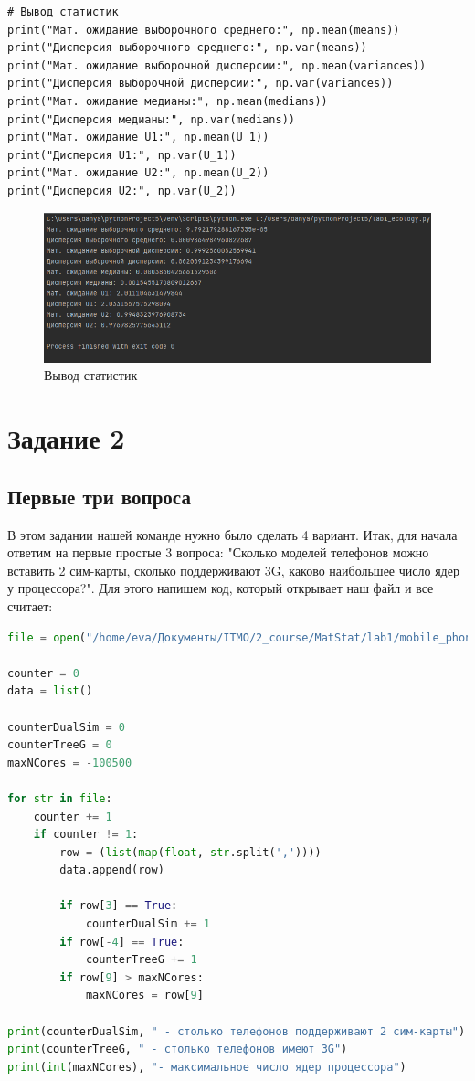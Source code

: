 \documentclass[14pt]{extreport}
\begin{document}
\begin{verbatim}
# Вывод статистик
print("Мат. ожидание выборочного среднего:", np.mean(means))
print("Дисперсия выборочного среднего:", np.var(means))
print("Мат. ожидание выборочной дисперсии:", np.mean(variances))
print("Дисперсия выборочной дисперсии:", np.var(variances))
print("Мат. ожидание медианы:", np.mean(medians))
print("Дисперсия медианы:", np.var(medians))
print("Мат. ожидание U1:", np.mean(U_1))
print("Дисперсия U1:", np.var(U_1))
print("Мат. ожидание U2:", np.mean(U_2))
print("Дисперсия U2:", np.var(U_2))
\end{verbatim}

\begin{figure}[H]
    \centering
    \includegraphics[width=0.9\linewidth]{6.png}
    \caption{Вывод статистик}
\end{figure}


\newpage
\chapter{Задание 2}
\section{Первые три вопроса}
    В этом задании нашей команде нужно было сделать 4 вариант.
Итак, для начала ответим на первые простые 3 вопроса: "Сколько моделей телефонов
можно вставить 2 сим-карты, сколько поддерживают 3G, каково наибольшее число ядер 
у процессора?". Для этого напишем код, который открывает наш файл и все считает:

\begin{lstlisting}[language=Python, caption={Код для первых трех вопросов}]
file = open("/home/eva/Документы/ITMO/2_course/MatStat/lab1/mobile_phones.csv")

counter = 0
data = list()

counterDualSim = 0
counterTreeG = 0
maxNCores = -100500

for str in file:
    counter += 1
    if counter != 1:
        row = (list(map(float, str.split(','))))
        data.append(row)

        if row[3] == True:
            counterDualSim += 1
        if row[-4] == True:
            counterTreeG += 1
        if row[9] > maxNCores:
            maxNCores = row[9]

print(counterDualSim, " - столько телефонов поддерживают 2 сим-карты")
print(counterTreeG, " - столько телефонов имеют 3G")
print(int(maxNCores), "- максимальное число ядер процессора")
\end{lstlisting}
\end{document}
